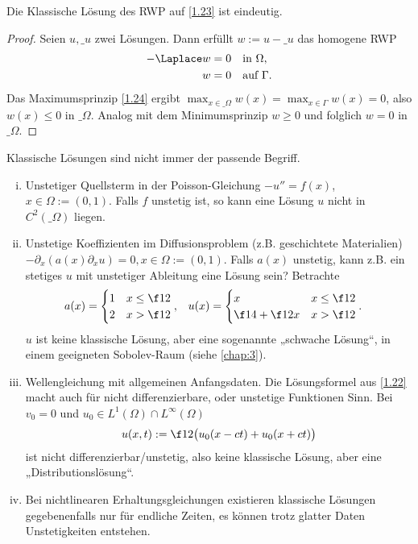 \begin{kor} \label{1.25}
	Die Klassische Lösung des RWP auf \ref{1.23} ist eindeutig.
	\begin{proof}
		Seien $u, \_u$ zwei Lösungen.
		Dann erfüllt $w := u - \_u$ das homogene RWP
		\begin{align*}
			-\Laplace w &= 0 & & \text{in $\Omega$}, \\
			w &= 0 && \text{auf $\Gamma$}.
		\end{align*}
		Das Maximumsprinzip \ref{1.24} ergibt $\max_{x\in\_\Omega} w(x) = \max_{x\in\Gamma} w(x) = 0$, also $w(x) \le 0$ in $\_\Omega$.
		Analog mit dem Minimumsprinzip $w \ge 0$ und folglich $w = 0$ in $\_\Omega$.
	\end{proof}
\end{kor}

\begin{nt*}
	Klassische Lösungen sind nicht immer der passende Begriff.
	\begin{enumerate}[i)]
		\item
			Unstetiger Quellsterm in der Poisson-Gleichung $-u'' = f(x)$, $x \in \Omega := (0,1)$.
			Falls $f$ unstetig ist, so kann eine Lösung $u$ nicht in $C^2(\_\Omega)$ liegen.
		\item
			Unstetige Koeffizienten im Diffusionsproblem (z.B. geschichtete Materialien) $-\partial_x(a(x) \partial_x u) = 0, x \in \Omega := (0,1)$.
			Falls $a(x)$ unstetig, kann z.B. ein stetiges $u$ mit unstetiger Ableitung eine Lösung sein?
			Betrachte
			\begin{align*}
				a (x) &= \begin{cases}
					1 & x \le \f 12 \\
					2 & x > \f 12
				\end{cases},&
				u(x) &= \begin{cases}
					x & x \le \f 12 \\
					\f 14 + \f 12 x & x > \f 12
				\end{cases}.
			\end{align*}
			$u$ ist keine klassische Lösung, aber eine sogenannte „schwache Lösung“, in einem geeigneten Sobolev-Raum (siehe \ref{chap:3}).
		\item
			Wellengleichung mit allgemeinen Anfangsdaten.
			Die Lösungsformel aus \ref{1.22} macht auch für nicht differenzierbare, oder unstetige Funktionen Sinn.
			Bei $v_0 = 0$ und $u_0 \in L^1(\Omega) \cap L^\infty(\Omega)$
			\[
				u(x,t) := \f 12 \big( u_0(x-ct) + u_0(x+ct)\big)
			\]
			ist nicht differenzierbar/unstetig, also keine klassische Lösung, aber eine „Distributionslösung“.
		\item
			Bei nichtlinearen Erhaltungsgleichungen existieren klassische Lösungen gegebenenfalls nur für endliche Zeiten, es können trotz glatter Daten Unstetigkeiten entstehen.
	\end{enumerate}
\end{nt*}

